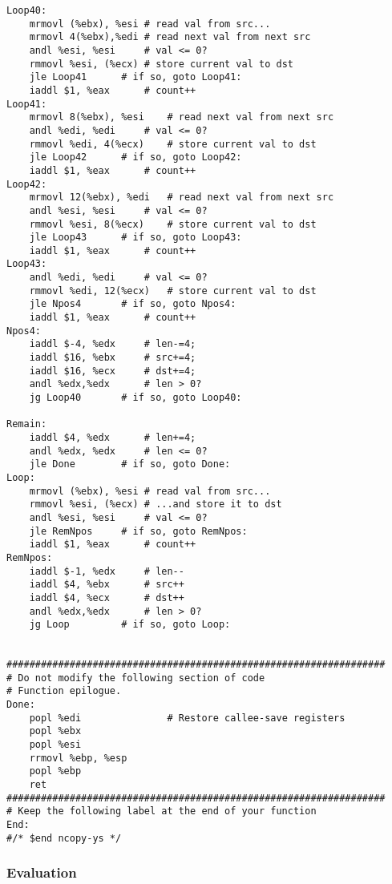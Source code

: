 \documentclass{article}
\begin{document}
\begin{lstlisting}[language={[x86masm]Assembler}]
Loop40:	
	mrmovl (%ebx), %esi	# read val from src...
	mrmovl 4(%ebx),%edi	# read next val from next src
	andl %esi, %esi		# val <= 0?
	rmmovl %esi, (%ecx)	# store current val to dst
	jle Loop41		# if so, goto Loop41:
	iaddl $1, %eax		# count++
Loop41:	
	mrmovl 8(%ebx), %esi	# read next val from next src
	andl %edi, %edi		# val <= 0?
	rmmovl %edi, 4(%ecx)	# store current val to dst
	jle Loop42		# if so, goto Loop42:
	iaddl $1, %eax		# count++
Loop42:	
	mrmovl 12(%ebx), %edi	# read next val from next src
	andl %esi, %esi		# val <= 0?
	rmmovl %esi, 8(%ecx)	# store current val to dst
	jle Loop43		# if so, goto Loop43:
	iaddl $1, %eax		# count++
Loop43:	
	andl %edi, %edi		# val <= 0?
	rmmovl %edi, 12(%ecx)	# store current val to dst
	jle Npos4		# if so, goto Npos4:
	iaddl $1, %eax		# count++
Npos4:	
	iaddl $-4, %edx		# len-=4;
	iaddl $16, %ebx		# src+=4;
	iaddl $16, %ecx		# dst+=4;
	andl %edx,%edx		# len > 0?
	jg Loop40		# if so, goto Loop40:

Remain:
	iaddl $4, %edx		# len+=4;
	andl %edx, %edx		# len <= 0?
	jle Done		# if so, goto Done:
Loop:
	mrmovl (%ebx), %esi	# read val from src...
	rmmovl %esi, (%ecx)	# ...and store it to dst
	andl %esi, %esi		# val <= 0?
	jle RemNpos		# if so, goto RemNpos:
	iaddl $1, %eax		# count++
RemNpos:
	iaddl $-1, %edx		# len--
	iaddl $4, %ebx		# src++
	iaddl $4, %ecx		# dst++
	andl %edx,%edx		# len > 0?
	jg Loop			# if so, goto Loop:

	
##################################################################
# Do not modify the following section of code
# Function epilogue.
Done:
	popl %edi               # Restore callee-save registers
	popl %ebx
	popl %esi
	rrmovl %ebp, %esp
	popl %ebp
	ret
##################################################################
# Keep the following label at the end of your function
End:
#/* $end ncopy-ys */

\end{lstlisting}


\subsubsection{Evaluation}
\end{document}

